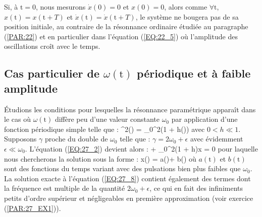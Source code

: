 Si, \`{a} $\mathrm{t} = 0$, nous mesurons $\dot{x}(0) = 0$ et $x(0) = 0$, alors comme $\forall\mathrm{t}$, $x(\mathrm{t}) = x(\mathrm{t} + T)$ et $\dot{x}(\mathrm{t}) = \dot{x}(\mathrm{t} + T)$, le syst\`{e}me ne bougera pas de sa position initiale, au contraire de la r\'{e}sonnance ordinaire \'{e}tudi\'{e}e au paragraphe (\ref{PAR:22}) et en particulier dans l'\'{e}quation (\ref{EQ:22_5}) o\`{u} l'amplitude des oscillations cro\^{i}t avec le temps.

\subsection{Cas particulier de $\omega(\mathrm{t})$ p\'{e}riodique et \`{a} faible amplitude}

\'{E}tudions les conditions pour lesquelles la r\'{e}sonnance param\'{e}trique appara\^{i}t dans le cas o\`{u} $\omega(\mathrm{t})$ diff\`{e}re peu d'une valeur constante $\omega_{0}$ par application d'une fonction p\'{e}riodique simple telle que :
\be
	\omega^{2}() = \omega_{0}^{2}(1 + h\cos(\gamma{})) \label{EQ:27_7}
\ee
avec $0 < h \ll 1$. Supposons $\gamma$ proche du double de $\omega_{0}$ telle que : $\gamma = 2\omega_{0} + \epsilon$ avec \'{e}videmment $\epsilon \ll \omega_{0}$. L'\'{e}quation (\ref{EQ:27_2}) devient alors :
\be
	 + \omega_{0}^{2}\left(1 + h\cos{}\right)x = 0\label{EQ:27_8}
\ee
pour laquelle nous chercherons la solution sous la forme :
\be
	x() = a()\cos{} + b()\sin{}\label{EQ:27_9}
\ee
o\`{u} $a(\mathrm{t})$ et $b(\mathrm{t})$ sont des fonctions du temps variant avec des pulsations bien plus faibles que $\omega_{0}$. La solution exacte \`{a} l'\'{e}quation (\ref{EQ:27_8}) contient \'{e}galement des termes dont la fr\'{e}quence est multiple de la quantit\'{e} $2\omega_{0} + \epsilon$, ce qui en fait des infiniments petits d'ordre sup\'{e}rieur et n\'{e}gligeables en premi\`{e}re approximation (voir exercice (\ref{PAR:27_EX1})).

